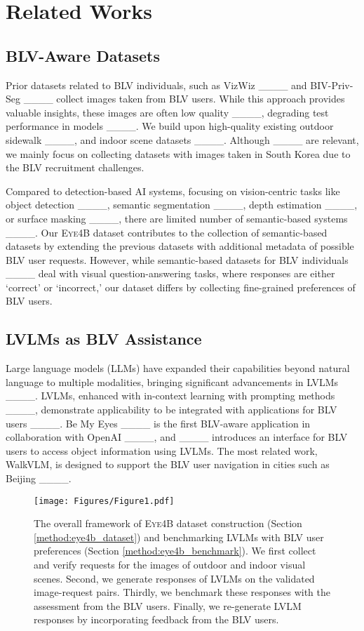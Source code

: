 \section{Related Works}
\subsection{BLV-Aware Datasets}

Prior datasets related to BLV individuals, such as VizWiz ____ and BIV-Priv-Seg ____ collect images taken from BLV users. While this approach provides valuable insights, these images are often low quality ____, degrading test performance in models ____. We build upon high-quality existing outdoor sidewalk ____, and indoor scene datasets ____. Although ____ are relevant, we mainly focus on collecting datasets with images taken in South Korea due to the BLV recruitment challenges.

Compared to detection-based AI systems, focusing on vision-centric tasks like object detection ____, semantic segmentation ____, depth estimation ____, or surface masking ____, there are limited number of semantic-based systems ____. Our \textsc{Eye4B} dataset contributes to the collection of semantic-based datasets by extending the previous datasets with additional metadata of possible BLV user requests. However, while semantic-based datasets for BLV individuals ____ deal with visual question-answering tasks, where responses are either `correct' or `incorrect,' our dataset differs by collecting fine-grained preferences of BLV users.

\subsection{LVLMs as BLV Assistance}

Large language models (LLMs) have expanded their capabilities beyond natural language to multiple modalities, bringing significant advancements in LVLMs ____. LVLMs, enhanced with in-context learning with prompting methods ____, demonstrate applicability to be integrated with applications for BLV users ____. Be My Eyes ____ is the first BLV-aware application in collaboration with OpenAI ____, and ____ introduces an interface for BLV users to access object information using LVLMs. The most related work, WalkVLM, is designed to support the BLV user navigation in cities such as Beijing ____.




\begin{figure*}[t!]
    \centering
    \texttt{[image: Figures/Figure1.pdf]}
    \caption{The overall framework of \textsc{Eye4B} dataset construction (Section \ref{method:eye4b_dataset}) and benchmarking LVLMs with BLV user preferences (Section \ref{method:eye4b_benchmark}). We first collect and verify requests for the images of outdoor and indoor visual scenes. Second, we generate responses of LVLMs on the validated image-request pairs. Thirdly, we benchmark these responses with the assessment from the BLV users. Finally, we re-generate LVLM responses by incorporating feedback from the BLV users.}
    \label{fig:dataset_gen_framework}
\end{figure*}
